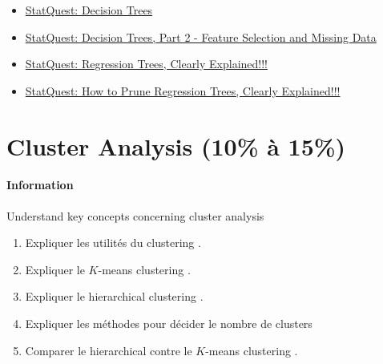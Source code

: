 \documentclass[12pt, titlepage, french]{report}
\begin{document}
\begin{YTB_vids}
\begin{itemize}
	\item	\href{https://www.youtube.com/watch?v=7VeUPuFGJHk&list=PLblh5JKOoLUICTaGLRoHQDuF_7q2GfuJF&index=34}{StatQuest: Decision Trees}
	\item	\href{https://www.youtube.com/watch?v=wpNl-JwwplA&list=PLblh5JKOoLUICTaGLRoHQDuF_7q2GfuJF&index=35}{StatQuest: Decision Trees, Part 2 - Feature Selection and Missing Data}
	\item	\href{https://www.youtube.com/watch?v=g9c66TUylZ4&list=PLblh5JKOoLUICTaGLRoHQDuF_7q2GfuJF&index=36}{StatQuest: Regression Trees, Clearly Explained!!!}
	\item	\href{https://www.youtube.com/watch?v=D0efHEJsfHo&list=PLblh5JKOoLUICTaGLRoHQDuF_7q2GfuJF&index=37}{StatQuest: How to Prune Regression Trees, Clearly Explained!!!}
\end{itemize}
\end{YTB_vids}

\newpage
\chapter[Cluster Analysis]{Cluster Analysis (10\% à 15\%)}

\subsubsection{Information}

\begin{distributions}[Objective]
Understand key concepts concerning cluster analysis
\end{distributions}

\begin{outcomes}
\begin{enumerate}
	\item	Expliquer les utilités du \og clustering \fg{}.
	\item	Expliquer le \og $K$-means clustering \fg{}.
	\item	Expliquer le \og hierarchical clustering \fg{}.
	\item	Expliquer les méthodes pour décider le nombre de \og clusters \fg{} 
	\item	Comparer le \og hierarchical \fg{} contre le \og $K$-means clustering \fg{}.
\end{enumerate}
\end{outcomes}
\end{document}
